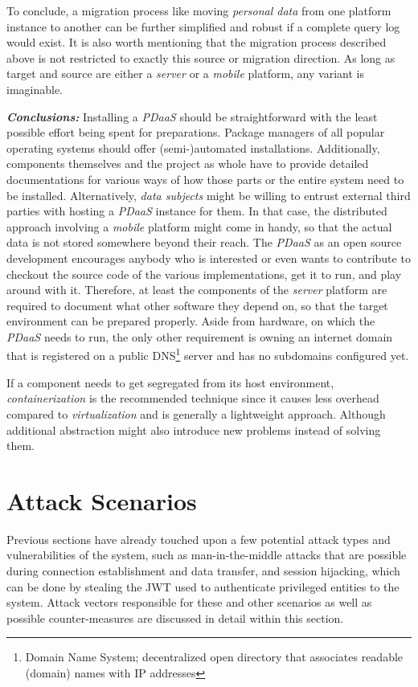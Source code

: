 \documentclass[12pt,english,a4paper,titlepage,cleardoublepage=empty,dottedtoc]{report}
\begin{document}
To conclude, a migration process like moving \emph{personal data} from
one platform instance to another can be further simplified and robust if
a complete query log would exist. It is also worth mentioning that the
migration process described above is not restricted to exactly this
source or migration direction. As long as target and source are either a
\emph{server} or a \emph{mobile} platform, any variant is imaginable.

\emph{\textbf{Conclusions:}} Installing a \emph{PDaaS} should be
straightforward with the least possible effort being spent for
preparations. Package managers of all popular operating systems should
offer (semi-)automated installations. Additionally, components
themselves and the project as whole have to provide detailed
documentations for various ways of how those parts or the entire system
need to be installed. Alternatively, \emph{data subjects} might be
willing to entrust external third parties with hosting a \emph{PDaaS}
instance for them. In that case, the distributed approach involving a
\emph{mobile} platform might come in handy, so that the actual data is
not stored somewhere beyond their reach. The \emph{PDaaS} as an open
source development encourages anybody who is interested or even wants to
contribute to checkout the source code of the various implementations,
get it to run, and play around with it. Therefore, at least the
components of the \emph{server} platform are required to document what
other software they depend on, so that the target environment can be
prepared properly. Aside from hardware, on which the \emph{PDaaS} needs
to run, the only other requirement is owning an internet domain that is
registered on a public DNS\footnote{Domain Name System; decentralized
  open directory that associates readable (domain) names with IP
  addresses} server and has no subdomains configured yet.

If a component needs to get segregated from its host environment,
\emph{containerization} is the recommended technique since it causes
less overhead compared to \emph{virtualization} and is generally a
lightweight approach. Although additional abstraction might also
introduce new problems instead of solving them.

\section{Attack Scenarios}\label{attack-scenarios}

Previous sections have already touched upon a few potential attack types
and vulnerabilities of the system, such as man-in-the-middle attacks
that are possible during connection establishment and data transfer, and
session hijacking, which can be done by stealing the JWT used to
authenticate privileged entities to the system. Attack vectors
responsible for these and other scenarios as well as possible
counter-measures are discussed in detail within this section.
\end{document}
